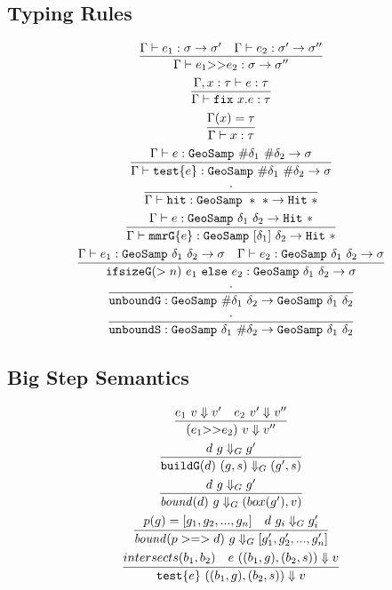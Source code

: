 \documentclass{article}
\newcommand {\chain}{\mathtt{>>}}
\newcommand {\fix}{\mathtt{fix}}
\newcommand {\test}{\mathtt{test}}
\newcommand {\isect}{\mathtt{hit}}
\newcommand {\buildG}{\mathtt{buildG}}
\newcommand {\unboundG}{\mathtt{unboundG}}
\newcommand {\unboundS}{\mathtt{unboundS}}
\newcommand {\mmrG}{\mathtt{mmrG}}
\newcommand {\geosamp}{\mathtt{GeoSamp}}
\newcommand {\hit}{\mathtt{Hit}}
\newcommand {\bound}{\mathit{bound}}
\newcommand {\inferenceSpacing}{\setlength{\jot}{3ex}}
\begin{document}
\subsection{Typing Rules}
\inferenceSpacing
\begin{gather}
\infer {\Gamma\vdash e_1 \chain e_2 : \sigma \to \sigma''}{\Gamma \vdash e_1 : \sigma\to \sigma' & \Gamma \vdash e_2 : \sigma' \to \sigma''} \\
\infer {\Gamma\vdash \fix~x.e : \tau}{\Gamma, x:\tau \vdash e : \tau} \\
\infer {\Gamma\vdash x : \tau}{\Gamma(x) = \tau} \\
\infer {\Gamma\vdash \test \{ e \} : \geosamp~\#\delta_1~\#\delta_2 \to \sigma}{\Gamma \vdash e : \geosamp~\#\delta_1~\#\delta_2  \to \sigma} \\
\infer {\Gamma \vdash \isect : \geosamp~\ast~\ast \to \hit~\ast} {\cdot} \\
\infer {\Gamma \vdash \mmrG \{ e \} : \geosamp~[\delta_1]~\delta_2 \to \hit~\ast} {\Gamma \vdash e : \geosamp~\delta_1~\delta_2 \to \hit~\ast }\\
\infer {\mathtt{ifsizeG}(>n)~e_1 \mathtt{~else~} e_2 : \geosamp~\delta_1~\delta_2 \to \sigma} {\Gamma \vdash e_1 : \geosamp~\delta_1~\delta_2 \to \sigma & \Gamma \vdash e_2 : \geosamp~\delta_1~\delta_2 \to \sigma} \\
\infer { \unboundG : \geosamp~\#\delta_1~\delta_2 \to \geosamp~\delta_1~\delta_2} {\cdot}\\
\infer { \unboundS : \geosamp~\delta_1~\#\delta_2 \to \geosamp~\delta_1~\delta_2} {\cdot}
\end{gather}

\subsection {Big Step Semantics}
\begin{gather}
\infer {(e_1 \chain e_2)~v \Downarrow v''}{e_1~ v \Downarrow v' & e_2~ v' \Downarrow v''} \\
\infer { \buildG (d)~(g,s) \Downarrow_G (g',s)}{d~g \Downarrow_G g'} \\
\infer { \bound (d)~g \Downarrow_G (box(g'),v)}{d~g \Downarrow_G g'} \\
\infer { \bound (p >=> d)~g \Downarrow_G [g_1', g_2',...,g_n']}{p(g) =[g_1, g_2,...,g_n] & d~g_i \Downarrow_G g_i'} \\
\infer { \test \{ e \}~((b_1,g),(b_2,s)) \Downarrow v}{intersects(b_1,b_2) & e~((b_1,g),(b_2,s)) \Downarrow v}
\end{gather}
\\
\end{document}
